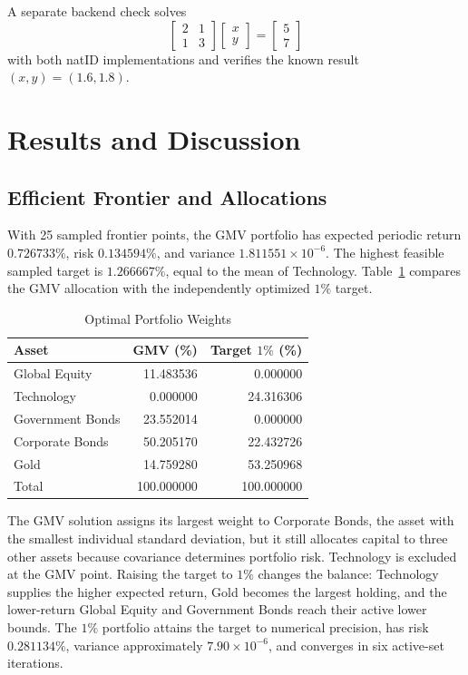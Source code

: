 \documentclass[conference]{IEEEtran}
\begin{document}
A separate backend check solves
\begin{equation}
 \begin{bmatrix}2&1\\1&3\end{bmatrix}
 \begin{bmatrix}x\\y\end{bmatrix}=
 \begin{bmatrix}5\\7\end{bmatrix}
 \label{eq:backend-check}
\end{equation}
with both natID implementations and verifies the known result
$(x,y)=(1.6,1.8)$.

\section{Results and Discussion}

\subsection{Efficient Frontier and Allocations}

With 25 sampled frontier points, the GMV portfolio has expected periodic
return $0.726733\%$, risk $0.134594\%$, and variance
$1.811551\times10^{-6}$. The highest feasible sampled target is
$1.266667\%$, equal to the mean of Technology. Table~\ref{tab:weights}
compares the GMV allocation with the independently optimized $1\%$ target.

\begin{table}[!t]
\caption{Optimal Portfolio Weights}
\label{tab:weights}
\centering
\footnotesize
\begin{tabular}{lrr}
\toprule
Asset & GMV (\%) & Target $1\%$ (\%)\\
\midrule
Global Equity    & 11.483536 & 0.000000\\
Technology       & 0.000000  & 24.316306\\
Government Bonds & 23.552014 & 0.000000\\
Corporate Bonds  & 50.205170 & 22.432726\\
Gold             & 14.759280 & 53.250968\\
\midrule
Total            & 100.000000 & 100.000000\\
\bottomrule
\end{tabular}
\end{table}

The GMV solution assigns its largest weight to Corporate Bonds, the asset with
the smallest individual standard deviation, but it still allocates capital to
three other assets because covariance determines portfolio risk. Technology is
excluded at the GMV point. Raising the target to $1\%$ changes the balance:
Technology supplies the higher expected return, Gold becomes the largest
holding, and the lower-return Global Equity and Government Bonds reach their
active lower bounds. The $1\%$ portfolio attains the target to numerical
precision, has risk $0.281134\%$, variance approximately
$7.90\times10^{-6}$, and converges in six active-set iterations.
\end{document}
